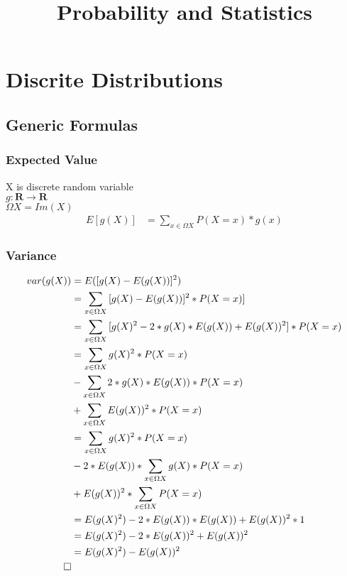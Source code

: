 \documentclass[]{book}
\title{Probability and Statistics}
\author{}
\begin{document}
	
\maketitle
	
\setcounter{tocdepth}{1}
\tableofcontents
\newpage

\chapter{Discrite Distributions}

\section{Generic Formulas}

\subsection{Expected Value}
X is discrete random variable\\
$g : \mathbf{R} \rightarrow \mathbf{R}$\\
$\Omega X = Im(X)$\\

\begin{align}
	E[g(X)] &= \sum_{x \in \Omega X} {P(X=x)*g(x)}
\end{align}

\subsection{Variance}

\begin{align}
	var(g(X)) &= E([g(X) - E(g(X))]^2)\\
	&= \sum_{x\in \Omega X} {[g(X) - E(g(X))]^2*P(X=x)]}\\
	&= \sum_{x\in \Omega X} {[g(X)^2 - 2*g(X)*E(g(X)) + E(g(X))^2]*P(X=x)}\\
	&= \sum_{x\in \Omega X} {g(X)^2*P(X=x)} \\&- \sum_{x\in \Omega X} {2*g(X)*E(g(X))*P(X=x)} \\&+ \sum_{x \in \Omega X} {E(g(X))^2*P(X=x)}\\
	&= \sum_{x\in \Omega X} {g(X)^2*P(X=x)} \\&- 2*E(g(X))*\sum_{x\in \Omega X} {g(X)*P(X=x)} \\&+ E(g(X))^2*\sum_{x \in \Omega X} {P(X=x)}\\
	&= E(g(X)^2) - 2*E(g(X))*E(g(X)) + E(g(X))^2*1\\
	&= E(g(X)^2) - 2*E(g(X))^2 + E(g(X))^2\\
	&= E(g(X)^2) - E(g(X))^2\\
	\qed
\end{align}
\end{document}
